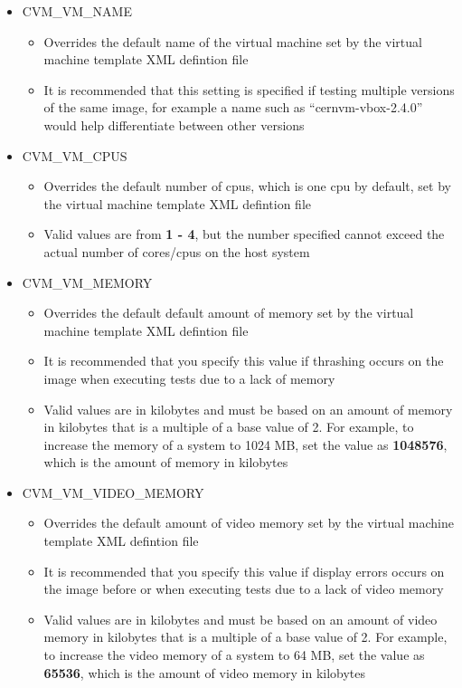 \begin{itemize}
\item	CVM\_VM\_NAME
		\begin{itemize}
		\item	Overrides the default name of the virtual machine set by the 
				virtual machine template XML defintion file
		\item	It is recommended that this setting is specified if testing multiple
				versions of the same \cernvm image, for example a name such as
				``cernvm-vbox-2.4.0'' would help differentiate between other versions
		\end{itemize}
		
\item	CVM\_VM\_CPUS
		\begin{itemize}
		\item	Overrides the default number of cpus, which is one cpu by default,
				set by the virtual machine template XML defintion file
		\item	Valid values are from {\bf 1 - 4}, but the number specified cannot
				exceed the actual number of cores/cpus on the host system
		\end{itemize}
	
\item	CVM\_VM\_MEMORY
		\begin{itemize}
		\item	Overrides the default default amount of memory set by the virtual machine
				template XML defintion file
		\item	It is recommended that you specify this value if thrashing occurs on the
				\cernvm image when executing tests due to a lack of memory
		\item	Valid values are in kilobytes and must be based on an amount of memory in
				kilobytes that is a multiple of a base value of 2. For example, to increase
				the memory of a system to 1024 MB, set the value as {\bf 1048576}, which is the
				amount of memory in kilobytes
		\end{itemize}
		
\item	CVM\_VM\_VIDEO\_MEMORY
		\begin{itemize}
		\item	Overrides the default amount of video memory set by the virtual machine
				template XML defintion file
		\item	It is recommended that you specify this value if display errors occurs on the
				\cernvm image before or when executing tests due to a lack of video memory
		\item	Valid values are in kilobytes and must be based on an amount of video memory in
				kilobytes that is a multiple of a base value of 2. For example, to increase
				the video memory of a system to 64 MB, set the value as {\bf 65536}, which is the
				amount of video memory in kilobytes
		\end{itemize}
		

\end{itemize}
